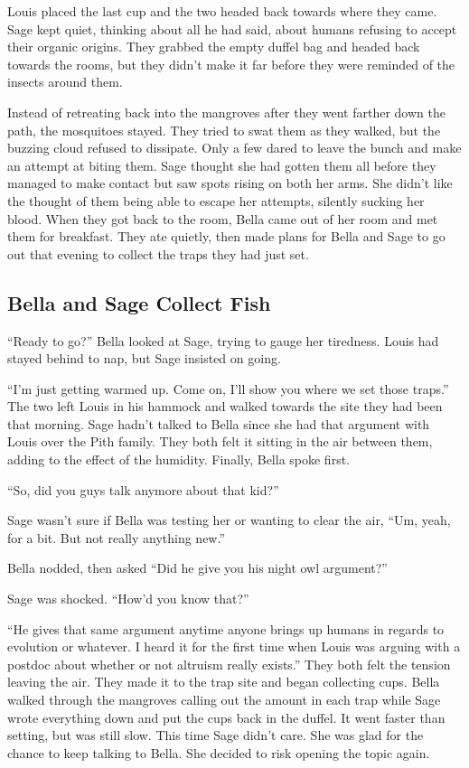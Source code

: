 \documentclass[12pt, fleqn, AofM.tex]{subfiles}
\begin{document}
Louis placed the last cup and the two headed back towards where they came. Sage kept quiet, thinking about all he had said, about humans refusing to accept their organic origins. They grabbed the empty duffel bag and headed back towards the rooms, but they didn't make it far before they were reminded of the insects around them. 

Instead of retreating back into the mangroves after they went farther down the path, the mosquitoes stayed. They tried to swat them as they walked, but the buzzing cloud refused to dissipate. Only a few dared to leave the bunch and make an attempt at biting them. Sage thought she had gotten them all before they managed to make contact but saw spots rising on both her arms. She didn't like the thought of them being able to escape her attempts, silently sucking her blood.
When they got back to the room, Bella came out of her room and met them for breakfast. They ate quietly, then made plans for Bella and Sage to go out that evening to collect the traps they had just set. 
 
\subsection{Bella and Sage Collect Fish}
“Ready to go?” Bella looked at Sage, trying to gauge her tiredness. Louis had stayed behind to nap, but Sage insisted on going. 

“I'm just getting warmed up. Come on, I'll show you where we set those traps.” The two left Louis in his hammock and walked towards the site they had been that morning. Sage hadn't talked to Bella since she had that argument with Louis over the Pith family. They both felt it sitting in the air between them, adding to the effect of the humidity. Finally, Bella spoke first.

“So, did you guys talk anymore about that kid?”

Sage wasn't sure if Bella was testing her or wanting to clear the air, “Um, yeah, for a bit. But not really anything new.”

Bella nodded, then asked “Did he give you his night owl argument?”

Sage was shocked. “How'd you know that?”

“He gives that same argument anytime anyone brings up humans in regards to evolution or whatever. I heard it for the first time when Louis was arguing with a postdoc about whether or not altruism really exists.” They both felt the tension leaving the air. They made it to the trap site and began collecting cups. Bella walked through the mangroves calling out the amount in each trap while Sage wrote everything down and put the cups back in the duffel. It went faster than setting, but was still slow. This time Sage didn't care. She was glad for the chance to keep talking to Bella. She decided to risk opening the topic again. 
\end{document}
